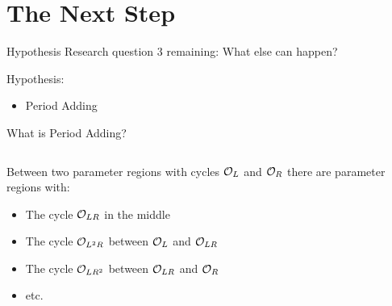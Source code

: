
\section{The Next Step}

\begin{frame}{Hypothesis}
    Research question 3 remaining: What else can happen?

    \pause
    \vspace{2em}
    Hypothesis:
    \begin{itemize}
        \item Period Adding
    \end{itemize}
\end{frame}

\begin{frame}{What is Period Adding?}
    \begin{columns}
        \begin{column}{.6 \textwidth}
            Between two parameter regions with cycles $\mathcal{O}_{L}$ and $\mathcal{O}_{R}$ there are parameter regions with:
            \begin{itemize}
                \item The cycle $\mathcal{O}_{LR}$ in the middle
                \item The cycle $\mathcal{O}_{L^2R}$ between $\mathcal{O}_{L}$ and $\mathcal{O}_{LR}$
                \item The cycle $\mathcal{O}_{LR^2}$ between $\mathcal{O}_{LR}$ and $\mathcal{O}_{R}$
                \item etc.
            \end{itemize}


\end{column}
\end{columns}
\end{frame}
